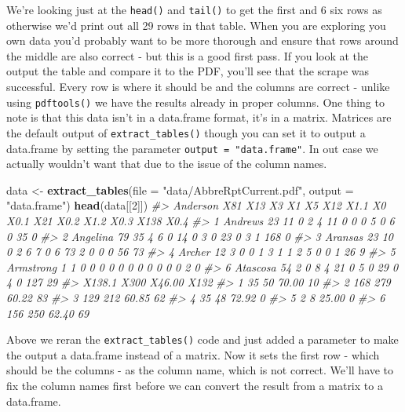 \documentclass[
  12pt,
]{book}
\newenvironment{Shaded}{\begin{snugshade}}{\end{snugshade}}
\newcommand{\CommentTok}[1]{\textcolor[rgb]{0.56,0.35,0.01}{\textit{#1}}}
\newcommand{\DataTypeTok}[1]{\textcolor[rgb]{0.13,0.29,0.53}{#1}}
\newcommand{\DecValTok}[1]{\textcolor[rgb]{0.00,0.00,0.81}{#1}}
\newcommand{\KeywordTok}[1]{\textcolor[rgb]{0.13,0.29,0.53}{\textbf{#1}}}
\newcommand{\NormalTok}[1]{#1}
\newcommand{\StringTok}[1]{\textcolor[rgb]{0.31,0.60,0.02}{#1}}
\begin{document}
We're looking just at the \texttt{head()} and \texttt{tail()} to get the first and 6 six rows as otherwise we'd print out all 29 rows in that table. When you are exploring you own data you'd probably want to be more thorough and ensure that rows around the middle are also correct - but this is a good first pass. If you look at the output the table and compare it to the PDF, you'll see that the scrape was successful. Every row is where it should be and the columns are correct - unlike using \texttt{pdftools()} we have the results already in proper columns. One thing to note is that this data isn't in a data.frame format, it's in a matrix. Matrices are the default output of \texttt{extract\_tables()} though you can set it to output a data.frame by setting the parameter \texttt{output\ =\ "data.frame"}. In out case we actually wouldn't want that due to the issue of the column names.

\begin{Shaded}
\begin{Highlighting}[]
\NormalTok{data <{-}}\StringTok{ }\KeywordTok{extract\_tables}\NormalTok{(}\DataTypeTok{file =} \StringTok{"data/AbbreRptCurrent.pdf"}\NormalTok{, }\DataTypeTok{output =} \StringTok{"data.frame"}\NormalTok{)}
\KeywordTok{head}\NormalTok{(data[[}\DecValTok{2}\NormalTok{]])}
\CommentTok{\#>    Anderson X81 X13 X3 X1 X5 X12 X1.1 X0 X0.1 X21 X0.2 X1.2 X0.3 X138 X0.4}
\CommentTok{\#> 1   Andrews  23  11  0  2  4  11    0  0    0   5    0    6    0   35    0}
\CommentTok{\#> 2  Angelina  79  35  4  6  0  14    0  3    0  23    0    3    1  168    0}
\CommentTok{\#> 3   Aransas  23  10  0  2  6   7    0  6   73   2    0    0    0   56   73}
\CommentTok{\#> 4    Archer  12   3  0  0  1   3    1  1    2   5    0    0    1   26    9}
\CommentTok{\#> 5 Armstrong   1   1  0  0  0   0    0  0    0   0    0    0    0    2    0}
\CommentTok{\#> 6  Atascosa  54   2  0  8  4  21    0  5    0  29    0    4    0  127   29}
\CommentTok{\#>   X138.1 X300 X46.00 X132}
\CommentTok{\#> 1     35   50  70.00   10}
\CommentTok{\#> 2    168  279  60.22   83}
\CommentTok{\#> 3    129  212  60.85   62}
\CommentTok{\#> 4     35   48  72.92    0}
\CommentTok{\#> 5      2    8  25.00    0}
\CommentTok{\#> 6    156  250  62.40   69}
\end{Highlighting}
\end{Shaded}

Above we reran the \texttt{extract\_tables()} code and just added a parameter to make the output a data.frame instead of a matrix. Now it sets the first row - which should be the columns - as the column name, which is not correct. We'll have to fix the column names first before we can convert the result from a matrix to a data.frame.
\end{document}
